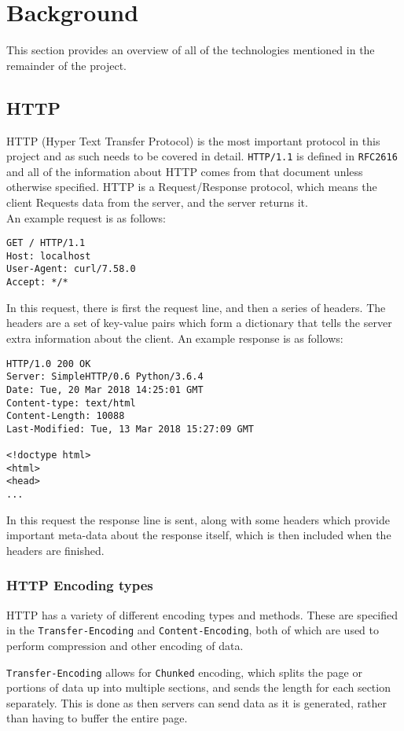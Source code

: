 \section{Background}
This section provides an overview of all of the technologies mentioned in the remainder of the project.
\subsection{HTTP}
HTTP (Hyper Text Transfer Protocol) is the most important protocol in this project and as such needs to be covered in detail.
\texttt{HTTP/1.1} is defined in \texttt{RFC2616}\cite{rfc2616} and all of the information about HTTP comes from that document unless otherwise specified.
HTTP is a Request/Response protocol, which means the client Requests data from the server, and the server returns it.\\
An example request is as follows:
\begin{verbatim}
GET / HTTP/1.1
Host: localhost
User-Agent: curl/7.58.0
Accept: */*
\end{verbatim}
In this request, there is first the request line, and then a series of headers. The headers are a set of key-value pairs which form a dictionary that tells the server extra information about the client.\vspace{0.4cm}\newline
An example response is as follows:
\begin{verbatim}
HTTP/1.0 200 OK
Server: SimpleHTTP/0.6 Python/3.6.4
Date: Tue, 20 Mar 2018 14:25:01 GMT
Content-type: text/html
Content-Length: 10088
Last-Modified: Tue, 13 Mar 2018 15:27:09 GMT

<!doctype html>
<html>
<head>
...
\end{verbatim}
In this request the response line is sent, along with some headers which provide important meta-data about the response itself, which is then included when the headers are finished.

\subsubsection{HTTP Encoding types}
HTTP has a variety of different encoding types and methods.
These are specified in the \texttt{Transfer-Encoding} and \texttt{Content-Encoding}, both of which are  used to perform compression and other encoding of data.\par
\texttt{Transfer-Encoding} allows for \texttt{Chunked} encoding\cite{rfc7230}, which splits the page or portions of data up into multiple sections, and sends the length for each section separately. This is done as then servers can send data as it is generated, rather than having to buffer the entire page.

